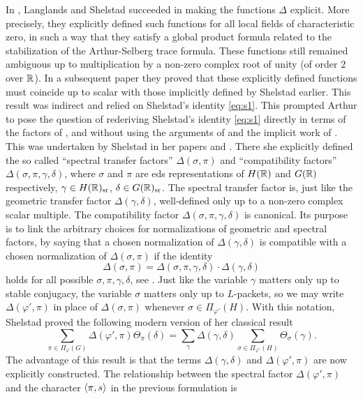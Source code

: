 \documentclass{article}
\theoremstyle{definition}
\numberwithin{equation}{section}
\renewcommand{\-}{\hyp{}}
\begin{document}
In \cite{LS87}, Langlands and Shelstad succeeded in making the functions $\Delta$ explicit. More precisely, they explicitly defined such functions for all local fields of characteristic zero, in such a way that they satisfy a global product formula related to the stabilization of the Arthur-Selberg trace formula. These functions still remained ambiguous up to multiplication by a non-zero complex root of unity (of order $2$ over $\mathbb{R}$). In a subsequent paper \cite[Theorem 2.6.A]{LS90} they proved that these explicitly defined functions must coincide up to scalar with those implicitly defined by Shelstad earlier. This result was indirect and relied on Shelstad's identity \eqref{eq:s1}. This prompted Arthur to pose the question \cite{Art08} of rederiving Shelstad's identity \eqref{eq:s1} directly in terms of the factors of \cite{LS87}, and without using the arguments of \cite{LS90} and the implicit work of \cite{She82}. This was undertaken by Shelstad in her papers \cite{SheTE1} and \cite{SheTE2}. There she explicitly  defined the so called ``spectral transfer factors'' $\Delta(\sigma,\pi)$ and ``compatibility factors'' $\Delta(\sigma,\pi,\gamma,\delta)$, where $\sigma$ and $\pi$ are eds representations of $H(\mathbb{R})$ and $G(\mathbb{R})$ respectively, $\gamma \in H(\mathbb{R})_{\textrm{sr}}$, $\delta \in G(\mathbb{R})_{\textrm{sr}}$. The spectral transfer factor is, just like the geometric transfer factor $\Delta(\gamma,\delta)$, well-defined only up to a non-zero complex scalar multiple. The compatibility factor $\Delta(\sigma,\pi,\gamma,\delta)$ is canonical. Its purpose is to link the arbitrary choices for normalizations of geometric and spectral factors, by saying that a chosen normalization of $\Delta(\gamma,\delta)$ is compatible with a chosen normalization of $\Delta(\sigma,\pi)$ if the identity
\[ \Delta(\sigma,\pi)  = \Delta(\sigma,\pi,\gamma,\delta) \cdot \Delta(\gamma,\delta) \]
holds for all possible $\sigma,\pi,\gamma,\delta$, see \cite[\S4]{SheTE2}. Just like the variable $\gamma$ matters only up to stable conjugacy, the variable $\sigma$ matters only up to $L$\-packets, so we may write $\Delta(\varphi',\pi)$ in place of $\Delta(\sigma,\pi)$ whenever $\sigma \in \Pi_{\varphi'}(H)$. With this notation, Shelstad proved the following modern version of her classical result
\begin{equation} \label{eq:s2}
	\sum_{\pi \in \Pi_\varphi(G)}\Delta(\varphi',\pi)\Theta_\pi(\delta) = \sum_\gamma \Delta(\gamma,\delta)\sum_{\sigma \in \Pi_{\varphi'}(H)} \Theta_{\sigma}(\gamma).
\end{equation}
The advantage of this result is that the terms $\Delta(\gamma,\delta)$ and $\Delta(\varphi',\pi)$ are now explicitly constructed. The relationship between the spectral factor $\Delta(\varphi',\pi)$ and the character $\langle\pi,s\rangle$ in the previous formulation is
\end{document}
